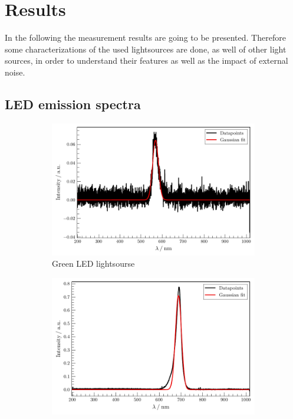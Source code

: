 

\section{Results}
\label{sec:Results}

In the following the measurement results are going to be presented. 
Therefore some characterizations of the used lightsources are done, as well of other light sources, in order to understand their features as well as the impact of external noise.

\subsection{LED emission spectra}
\label{sec:LED}
\begin{figure}
    \centering
\begin{subfigure}{.3\textwidth}
    \centering
    \includegraphics[width=\textwidth]{plots/LED-Green.pdf}
    \caption{Green LED lightsourse}
    \label{fig:LEDG}
\end{subfigure}
\begin{subfigure}{.3\textwidth}
    \centering
    \includegraphics[width=\textwidth]{plots/LED-Red.pdf}

\end{subfigure}
\end{figure}
